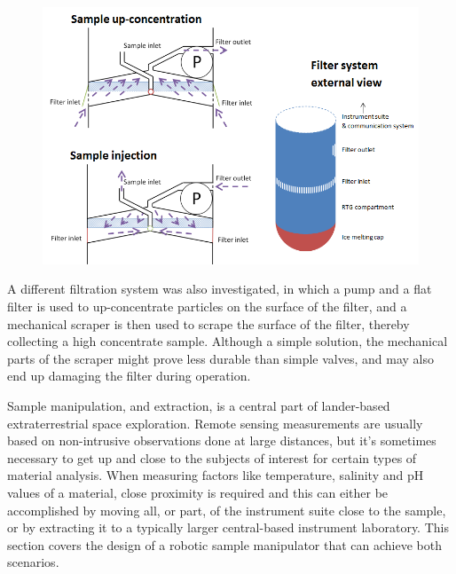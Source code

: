 \begin{figure}[htb]
	\centering
	\includegraphics[width=\textwidth]{figures/mlh/filter_multi.PNG}
	\caption{}
	\label{fig:filter}
\end{figure}

A different filtration system was also investigated, in which a pump and a flat filter is used to up-concentrate particles on the surface of the filter, and a mechanical scraper is then used to scrape the surface of the filter, thereby collecting a high concentrate sample. Although a simple solution, the mechanical parts of the scraper might prove less durable than simple valves, and may also end up damaging the filter during operation. 

Sample manipulation, and extraction, is a central part of lander-based extraterrestrial space exploration. Remote sensing measurements are usually based on non-intrusive observations done at large distances, but it's sometimes necessary to get up and close to the subjects of interest for certain types of material analysis. When measuring factors like temperature, salinity and pH values of a material, close proximity is required and this can either be accomplished by moving all, or part, of the instrument suite close to the sample, or by extracting it to a typically larger central-based instrument laboratory. This section covers the design of a robotic sample manipulator that can achieve both scenarios.

